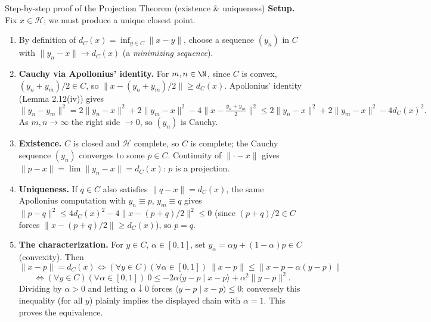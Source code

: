 \documentclass[aspectratio=169,10pt]{beamer}
\newcommand{\Hil}{\mathcal{H}}
\newcommand{\ip}[2]{\langle #1 \mid #2 \rangle}
\newcommand{\norm}[1]{\lVert #1 \rVert}
\newcommand{\dC}{d_C}
\begin{document}
\begin{frame}{Step-by-step proof of the Projection Theorem (existence \& uniqueness)}
  \textbf{Setup.} Fix $x\in\Hil$; we must produce a unique closest point.
  \begin{enumerate}
    \item By definition of $\dC(x)=\inf_{y\in C}\norm{x-y}$, choose a
      sequence $(y_n)$ in $C$ with $\norm{y_n-x}\to \dC(x)$ (a
      \emph{minimizing sequence}).
    \item \textbf{Cauchy via Apollonius' identity.} For $m,n\in\N$, since $C$
      is convex, $(y_n+y_m)/2\in C$, so $\norm{x-(y_n+y_m)/2}\ge \dC(x)$.
      Apollonius' identity (Lemma 2.12(iv)) gives
      \[
        \norm{y_n-y_m}^2 = 2\norm{y_n-x}^2+2\norm{y_m-x}^2-4\norm{x-\tfrac{y_n+y_m}{2}}^2
        \le 2\norm{y_n-x}^2+2\norm{y_m-x}^2-4\dC(x)^2.
      \]
      As $m,n\to\infty$ the right side $\to 0$, so $(y_n)$ is Cauchy.
    \item \textbf{Existence.} $C$ is closed and $\Hil$ complete, so $C$ is
      complete; the Cauchy sequence $(y_n)$ converges to some $p\in C$.
      Continuity of $\norm{\cdot-x}$ gives $\norm{p-x}=\lim\norm{y_n-x}
      =\dC(x)$: $p$ is a projection.
    \item \textbf{Uniqueness.} If $q\in C$ also satisfies $\norm{q-x}=\dC(x)$,
      the same Apollonius computation with $y_n\equiv p$, $y_m\equiv q$
      gives $\norm{p-q}^2 \le 4\dC(x)^2 - 4\norm{x-(p+q)/2}^2 \le 0$ (since
      $(p+q)/2\in C$ forces $\norm{x-(p+q)/2}\ge \dC(x)$), so $p=q$.
    \item \textbf{The characterization.} For $y\in C$, $\alpha\in[0,1]$, set
      $y_\alpha=\alpha y+(1-\alpha)p\in C$ (convexity). Then
      \[
        \norm{x-p}=\dC(x) \iff (\forall y\in C)(\forall\alpha\in[0,1])\
        \norm{x-p}\le\norm{x-p-\alpha(y-p)}
      \]
      \[
        \iff (\forall y\in C)(\forall \alpha\in[0,1])\ 0 \le -2\alpha\ip{y-p}{x-p}+\alpha^2\norm{y-p}^2.
      \]
      Dividing by $\alpha>0$ and letting $\alpha\downarrow 0$ forces
      $\ip{y-p}{x-p}\le 0$; conversely this inequality (for all $y$) plainly
      implies the displayed chain with $\alpha=1$. This proves the
      equivalence. \qedhere
  \end{enumerate}
\end{frame}
\end{document}
